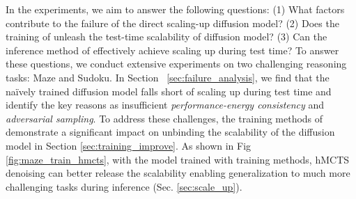 In the experiments, we aim to answer the following questions: (1) What factors contribute to the failure of the direct scaling-up diffusion model? (2) Does the training of \proj unleash the test-time scalability of diffusion model? (3) Can the inference method of \proj effectively achieve scaling up during test time? To answer these questions, we conduct extensive experiments on two challenging reasoning tasks: Maze and Sudoku. In Section ~\ref{sec:failure_analysis}, we find that the na\"ively trained diffusion model falls short of scaling up during test time and identify the key reasons as insufficient \emph{performance-energy consistency} and \emph{adversarial sampling}. To address these challenges, the training methods of \proj demonstrate a significant impact on unbinding the scalability of the diffusion model in Section \ref{sec:training_improve}. As shown in  Fig \ref{fig:maze_train_hmcts}, with the model trained with \proj training methods, hMCTS denoising can better release the scalability enabling generalization to much more challenging tasks during inference (Sec. \ref{sec:scale_up}).

